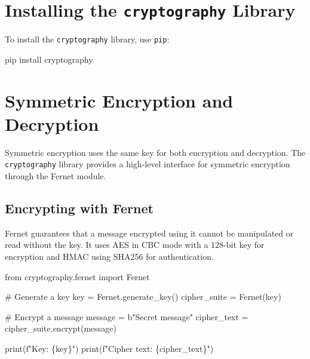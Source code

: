\documentclass[
  letterpaper,
  DIV=11,
  numbers=noendperiod]{scrreprt}
\newenvironment{Shaded}{\begin{snugshade}}{\end{snugshade}}
\newcommand{\BuiltInTok}[1]{\textcolor[rgb]{0.00,0.23,0.31}{#1}}
\newcommand{\CommentTok}[1]{\textcolor[rgb]{0.37,0.37,0.37}{#1}}
\newcommand{\ExtensionTok}[1]{\textcolor[rgb]{0.00,0.23,0.31}{#1}}
\newcommand{\ImportTok}[1]{\textcolor[rgb]{0.00,0.46,0.62}{#1}}
\newcommand{\NormalTok}[1]{\textcolor[rgb]{0.00,0.23,0.31}{#1}}
\newcommand{\OperatorTok}[1]{\textcolor[rgb]{0.37,0.37,0.37}{#1}}
\newcommand{\SpecialCharTok}[1]{\textcolor[rgb]{0.37,0.37,0.37}{#1}}
\newcommand{\SpecialStringTok}[1]{\textcolor[rgb]{0.13,0.47,0.30}{#1}}
\newcommand{\StringTok}[1]{\textcolor[rgb]{0.13,0.47,0.30}{#1}}
\begin{document}
\section{\texorpdfstring{Installing the \texttt{cryptography}
Library}{Installing the cryptography Library}}\label{installing-the-cryptography-library-1}

To install the \texttt{cryptography} library, use \texttt{pip}:

\begin{Shaded}
\begin{Highlighting}[]
\ExtensionTok{pip}\NormalTok{ install cryptography}
\end{Highlighting}
\end{Shaded}

\section{Symmetric Encryption and
Decryption}\label{symmetric-encryption-and-decryption}

Symmetric encryption uses the same key for both encryption and
decryption. The \texttt{cryptography} library provides a high-level
interface for symmetric encryption through the Fernet module.

\subsection{Encrypting with Fernet}\label{encrypting-with-fernet}

Fernet guarantees that a message encrypted using it cannot be
manipulated or read without the key. It uses AES in CBC mode with a
128-bit key for encryption and HMAC using SHA256 for authentication.

\begin{Shaded}
\begin{Highlighting}[]
\ImportTok{from}\NormalTok{ cryptography.fernet }\ImportTok{import}\NormalTok{ Fernet}

\CommentTok{\# Generate a key}
\NormalTok{key }\OperatorTok{=}\NormalTok{ Fernet.generate\_key()}
\NormalTok{cipher\_suite }\OperatorTok{=}\NormalTok{ Fernet(key)}

\CommentTok{\# Encrypt a message}
\NormalTok{message }\OperatorTok{=} \StringTok{b"Secret message"}
\NormalTok{cipher\_text }\OperatorTok{=}\NormalTok{ cipher\_suite.encrypt(message)}

\BuiltInTok{print}\NormalTok{(}\SpecialStringTok{f"Key: }\SpecialCharTok{\{}\NormalTok{key}\SpecialCharTok{\}}\SpecialStringTok{"}\NormalTok{)}
\BuiltInTok{print}\NormalTok{(}\SpecialStringTok{f"Cipher text: }\SpecialCharTok{\{}\NormalTok{cipher\_text}\SpecialCharTok{\}}\SpecialStringTok{"}\NormalTok{)}
\end{Highlighting}
\end{Shaded}
\end{document}
